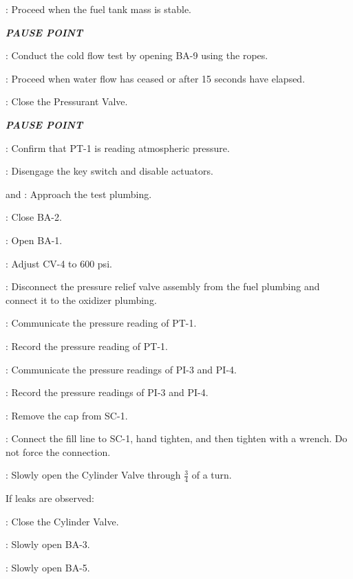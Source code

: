 \begin{checklist}
    \item \daq{}: Proceed when the fuel tank mass is stable.
    \item \textbf{\textit{PAUSE POINT}}
    \item \primary{}: Conduct the cold flow test by opening BA-9 using the ropes.
    \item \ops{}: Proceed when water flow has ceased or after 15 seconds have elapsed.
    \item \control{}: Close the Pressurant Valve.
    \item \textbf{\textit{PAUSE POINT}}
    \item \daq{}: Confirm that PT-1 is reading atmospheric pressure.
	\item \control{}: Disengage the key switch and disable actuators.    
    \item \primary{} and \secondary{}: Approach the test plumbing.
    \item \primary{}: Close BA-2.
    \item \primary{}: Open BA-1.
    \item \primary{}: Adjust CV-4 to 600 psi.
    \item \primary{}: Disconnect the pressure relief valve assembly from the fuel plumbing and connect it to the oxidizer plumbing.
    \item \daq{}: Communicate the pressure reading of PT-1.
    \item \ops{}: Record the pressure reading of PT-1.
    \item \primary{}: Communicate the pressure readings of PI-3 and PI-4.
    \item \ops{}: Record the pressure readings of PI-3 and PI-4.
    \item \primary{}: Remove the cap from SC-1.
    \item \primary{}: Connect the fill line to SC-1, hand tighten, and then tighten with a wrench. Do not force the connection.
    \item \primary{}: Slowly open the Cylinder Valve through $\frac{3}{4}$  of a turn.
    \begin{checklist}[label=$\bullet$]
        \item If leaks are observed:
        \begin{checklist}
            \item \primary{}: Close the Cylinder Valve.
            \item \primary{}: Slowly open BA-3.
            \item \primary{}: Slowly open BA-5.

\end{checklist}
\end{checklist}
\end{checklist}
